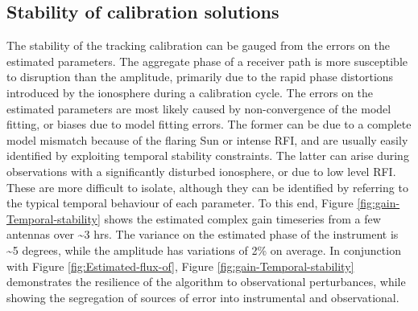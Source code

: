 \documentclass{aa}
\begin{document}
\subsection{\label{sub:Stability}Stability of calibration solutions}
The stability of  the tracking calibration can be gauged from  the errors on the
estimated parameters. The aggregate phase of a receiver path is more susceptible
to disruption than  the amplitude, primarily due to  the rapid phase distortions
introduced  by the  ionosphere during  a calibration  cycle. The  errors  on the
estimated  parameters are  most likely  caused by  non-convergence of  the model
fitting, or  biases due  to model  fitting errors. The  former can  be due  to a
complete  model mismatch  because of  the flaring  Sun or  intense RFI,  and are
usually  easily identified  by exploiting  temporal stability  constraints.  The
latter can arise during  observations with a significantly disturbed ionosphere,
or due to low level RFI.  These are more difficult to isolate, although they can
be identified by referring to  the typical temporal behaviour of each parameter.
To  this  end,  Figure  \ref{fig:gain-Temporal-stability}  shows  the  estimated
complex gain  timeseries from a  few antennas over \textasciitilde{}3  hrs.  The
variance on the estimated phase of the instrument is \textasciitilde{}5 degrees,
while  the amplitude  has variations  of 2\%  on average.   In  conjunction with
Figure   \ref{fig:Estimated-flux-of},   Figure  \ref{fig:gain-Temporal-stability}
demonstrates  the resilience  of  the algorithm  to observational  perturbances,
while  showing  the  segregation  of  sources of  error  into  instrumental  and
observational.
\end{document}
